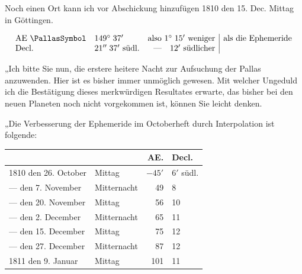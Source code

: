 \noindent Noch einen Ort kann ich vor Abschickung hinzufügen 1810 den 15. Dec. Mittag in Göttingen.

{\fontsize{10}{12}\selectfont\[\begin{array}{llr|l}\text{AE }\PallasSymbol & 149^\circ\;37' & \text{also }1^\circ\;15'\text{ weniger} & \raisebox{-0.6\baselineskip}{als die Ephemeride}\\\text{Decl.} & 21''\;37'\text{ südl.} & \text{—}\quad 12'\text{ südlicher} & \end{array}\]}

\par\indent „Ich bitte Sie nun, die erstere heitere Nacht zur Aufsuchung der Pallas anzuwenden. Hier ist es bisher immer unmöglich gewesen. Mit welcher Ungeduld ich die Bestätigung dieses merkwürdigen Resultates erwarte, das bisher bei den neuen Planeten noch nicht vorgekommen ist, können Sie leicht denken.

\par\indent „Die Verbesserung der Ephemeride im Octoberheft durch Interpolation ist folgende:
\begin{center}\fontsize{10}{12}\selectfont\setlength{\tabcolsep}{4pt}\renewcommand{\arraystretch}{1.15}\begin{tabular}{ll|r|l}
 &  & AE. & Decl.\\\hline
1810 den 26. October & Mittag & $-45'$ & $6'$ südl.\\
--- den 7. November & Mitternacht & 49 & 8\\
--- den 20. November & Mittag & 56 & 10\\
--- den 2. December & Mitternacht & 65 & 11\\
--- den 15. December & Mittag & 75 & 12\\
--- den 27. December & Mitternacht & 87 & 12\\
1811 den 9. Januar & Mittag & 101 & 11\\
\end{tabular}\end{center}

